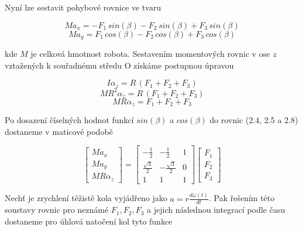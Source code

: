 \noindent Nyní lze sestavit pohybové rovnice ve tvaru

\begin{equation}
Ma_{x}=-F_{1}\,sin(\beta)-F_{2}\,sin(\beta)+F_{3}\,sin(\beta)
\end{equation}
\begin{equation}
Ma_{y}=F_{1}\,cos(\beta)-F_{2}\,cos(\beta)+F_{3}\,cos(\beta)
\end{equation}\vspace{5mm}

\noindent kde $M$ je celková hmotnost robota. Sestavením momentových rovnic v ose $z$ vztažených k souřadnému středu O získáme postupnou úpravou

\begin{equation}
I\alpha_{z}=R\,(F_{1}+F_{2}+F_{3})
\end{equation}
\begin{equation}
MR^2\alpha_{z}=R\,(F_{1}+F_{2}+F_{3})
\end{equation}
\begin{equation}
MR\alpha_{z}=F_{1}+F_{2}+F_{3}
\end{equation}

\newpage

\noindent Po dosazení číselných hodnot funkcí $sin(\beta)$ a $cos(\beta)$ do rovnic (2.4, 2.5 a 2.8) dostaneme v maticové podobě

\begin{figure}[htb]
\begin{equation}
\begin{bmatrix}
  Ma_{x} \\[0.5em]  
  Ma_{y} \\[0.5em]   
  MR\alpha_{z}
\end{bmatrix}
=
\begin{bmatrix}
  -\frac{1}{2} &  -\frac{1}{2} & 1\\[0.5em]
  \frac{\sqrt{3}}{2} & -\frac{\sqrt{3}}{2} &  0 \\[0.5em]  
  1 & 1 &  1 
\end{bmatrix}
\begin{bmatrix}
  F_{1} \\[0.5em]  
  F_{2} \\[0.5em]     
  F_{3} 
\end{bmatrix}
\end{equation}
\end{figure}
\vspace{3mm}
\noindent Nechť je zrychlení těžistě kola vyjádřeno jako $a=r\frac{d\omega(t)}{dt}$. Pak řešením této soustavy rovnic \cite{kuala} pro neznámé $F_{1}, F_{2}, F_{3}$ a jejich následnou integrací podle času dostaneme pro úhlová natočení kol tyto funkce

